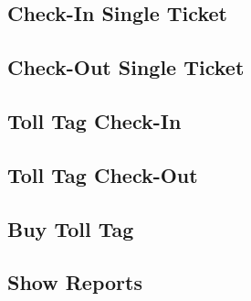\subsection{Check-In Single Ticket}


\subsection{Check-Out Single Ticket}


\subsection{Toll Tag Check-In}


\subsection{Toll Tag Check-Out}


\subsection{Buy Toll Tag}


\subsection{Show Reports}

